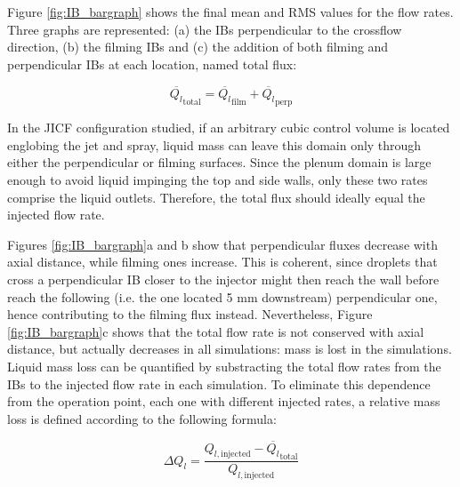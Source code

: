 \clearpage

Figure \ref{fig:IB_bargraph} shows the final mean and RMS values for the flow rates. Three graphs are represented: (a) the IBs perpendicular to the crossflow direction, (b) the filming IBs and (c) the addition of both filming and perpendicular IBs at each location, named total flux:

\vspace*{-0.1in}

\begin{equation}
\overline{Q_l}_{\mathrm{total}} = \overline{Q_l}_{\mathrm{film}} + \overline{Q_l}_{\mathrm{perp}}
\end{equation}

In the JICF configuration studied, if an arbitrary cubic control volume is located englobing the jet and spray, liquid mass can leave this domain only through either the perpendicular or filming surfaces. Since the plenum domain is large enough to avoid liquid impinging the top and side walls, only these two rates comprise the liquid outlets. Therefore, the total flux should ideally equal the injected flow rate. %

Figures \ref{fig:IB_bargraph}a and b show that perpendicular fluxes decrease with axial distance, while filming ones increase. This is coherent, since droplets that cross a perpendicular IB closer to the injector might then reach the wall before reach the following (i.e. the one located 5 mm downstream) perpendicular one, hence contributing to the filming flux instead. Nevertheless, Figure \ref{fig:IB_bargraph}c shows that the total flow rate is not conserved with axial distance, but actually decreases in all simulations: mass is lost in the simulations. Liquid mass loss can be quantified by substracting the total flow rates from the IBs to the injected flow rate in each simulation. To eliminate this dependence from the operation point, each one with different injected rates, a relative mass loss is defined according to the following formula:


\vspace*{-0.05in}
\begin{equation}
\Delta Q_l = \frac{Q_{l,\mathrm{injected}} - \overline{Q_l}_{\mathrm{total}}}{Q_{l,\mathrm{injected}}}
\end{equation}




